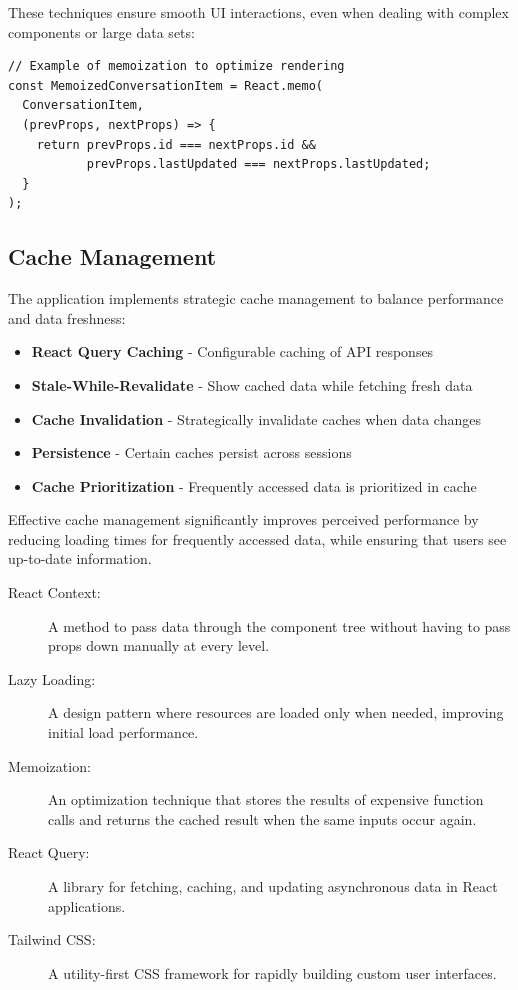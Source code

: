These techniques ensure smooth UI interactions, even when dealing with complex components or large data sets:

\begin{verbatim}
// Example of memoization to optimize rendering
const MemoizedConversationItem = React.memo(
  ConversationItem, 
  (prevProps, nextProps) => {
    return prevProps.id === nextProps.id && 
           prevProps.lastUpdated === nextProps.lastUpdated;
  }
);
\end{verbatim}

\subsection{Cache Management}

The application implements strategic cache management to balance performance and data freshness:

\begin{itemize}
  \item \textbf{React Query Caching} - Configurable caching of API responses
  \item \textbf{Stale-While-Revalidate} - Show cached data while fetching fresh data
  \item \textbf{Cache Invalidation} - Strategically invalidate caches when data changes
  \item \textbf{Persistence} - Certain caches persist across sessions
  \item \textbf{Cache Prioritization} - Frequently accessed data is prioritized in cache
\end{itemize}

Effective cache management significantly improves perceived performance by reducing loading times for frequently accessed data, while ensuring that users see up-to-date information.

\begin{mdframed}[
  linewidth=0.5pt,
  frametitle={Terminology},
  frametitlefont=\normalfont\bfseries,
  backgroundcolor=gray!10,
  roundcorner=4pt,
  skipabove=7pt,
  skipbelow=7pt
]
\begin{description}
  \item[React Context:] A method to pass data through the component tree without having to pass props down manually at every level.
  \item[Lazy Loading:] A design pattern where resources are loaded only when needed, improving initial load performance.
  \item[Memoization:] An optimization technique that stores the results of expensive function calls and returns the cached result when the same inputs occur again.
  \item[React Query:] A library for fetching, caching, and updating asynchronous data in React applications.
  \item[Tailwind CSS:] A utility-first CSS framework for rapidly building custom user interfaces.
\end{description}
\end{mdframed}

